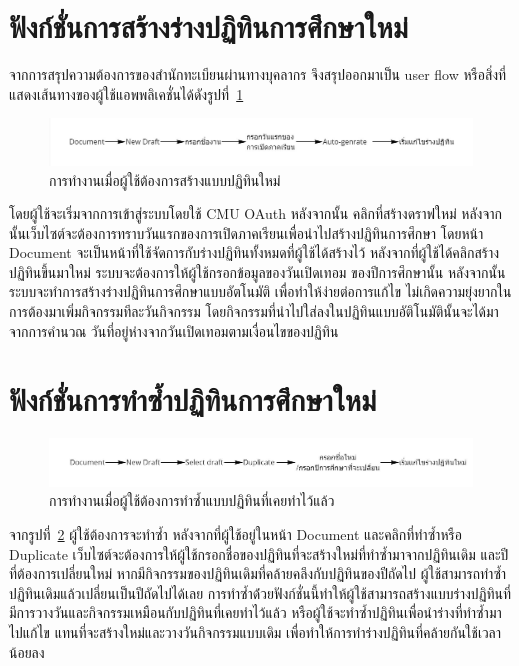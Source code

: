 \section{ฟังก์ชั่นการสร้างร่างปฏิทินการศึกษาใหม่}
จากการสรุปความต้องการของสำนักทะเบียนผ่านทางบุคลากร จึงสรุปออกมาเป็น user flow หรือสิ่งที่แสดงเส้นทางของผู้ใช้แอพพลิเคชั่นได้ดังรูปที่~\ref{fig:user-flow-new}

%
\begin{figure}[h]
\centering
\includegraphics[width=1\textwidth]{pic3.1.jpg}
\caption{การทำงานเมื่อผู้ใช้ต้องการสร้างแบบปฏิทินใหม่}
\label{fig:user-flow-new}
\end{figure}
%
โดยผู้ใช้จะเริ่มจากการเข้าสู่ระบบโดยใช้ CMU OAuth หลังจากนั้น คลิกที่สร้างดราฟใหม่ 
หลังจากนั้นเว็บไซต์จะต้องการทราบวันแรกของการเปิดภาคเรียนเพื่อนำไปสร้างปฏิทินการศึกษา
โดยหน้า Document จะเป็นหน้าที่ใช้จัดการกับร่างปฏิทินทั้งหมดที่ผู้ใช้ได้สร้างไว้
หลังจากที่ผู้ใช้ได้คลิกสร้างปฏิทินขึ้นมาใหม่ ระบบจะต้องการให้ผู้ใช้กรอกข้อมูลของวันเปิดเทอม
ของปีการศึกษานั้น หลังจากนั้นระบบจะทำการสร้างร่างปฏิทินการศึกษาแบบอัตโนมัติ
เพื่อทำให้ง่ายต่อการแก้ไข ไม่เกิดความยุ่งยากในการต้องมาเพิ่มกิจกรรมทีละวันกิจกรรม
โดยกิจกรรมที่นำไปใส่ลงในปฏิทินแบบอัติโนมัตินั้นจะได้มาจากการคำนวณ
วันที่อยู่ห่างจากวันเปิดเทอมตามเงื่อนไขของปฏิทิน

\section{ฟังก์ชั่นการทำซ้ำปฏิทินการศึกษาใหม่}
\begin{figure}[h]
\centering
\includegraphics[width=1\textwidth]{pic3.2.jpg}
\caption{การทำงานเมื่อผู้ใช้ต้องการทำซ้ำแบบปฏิทินที่เคยทำไว้แล้ว}
\label{fig:user-flow-duplicate}
\end{figure}
จากรูปที่~\ref{fig:user-flow-duplicate} ผู้ใช้ต้องการจะทำซ้ำ หลังจากที่ผู้ใช้อยู่ในหน้า Document และคลิกที่ทำซ้ำหรือ Duplicate
เว็บไซต์จะต้องการให้ผู้ใช้กรอกชื่อของปฏิทินที่จะสร้างใหม่ที่ทำซ้ำมาจากปฏิทินเดิม
และปีที่ต้องการเปลี่ยนใหม่ หากมีกิจกรรมของปฏิทินเดิมที่คล้ายคลึงกับปฏิทินของปีถัดไป 
ผู้ใช้สามารถทำซ้ำปฏิทินเดิมแล้วเปลี่ยนเป็นปีถัดไปได้เลย 
การทำซ้ำด่้วยฟังก์ชั่นนี้ทำให้ผู้ใช้สามารถสร้างแบบร่างปฏิทินที่มีการวางวันและกิจกรรมเหมือนกับปฏิทินที่เคยทำไว้แล้ว
หรือผู้ใช้จะทำซ้ำปฏิทินเพื่อนำร่างที่ทำซ้ำมาไปแก้ไข แทนที่จะสร้างใหม่และวางวันกิจกรรมแบบเดิม เพื่อทำให้การทำร่างปฏิทินที่คล้ายกันใช้เวลาน้อยลง

